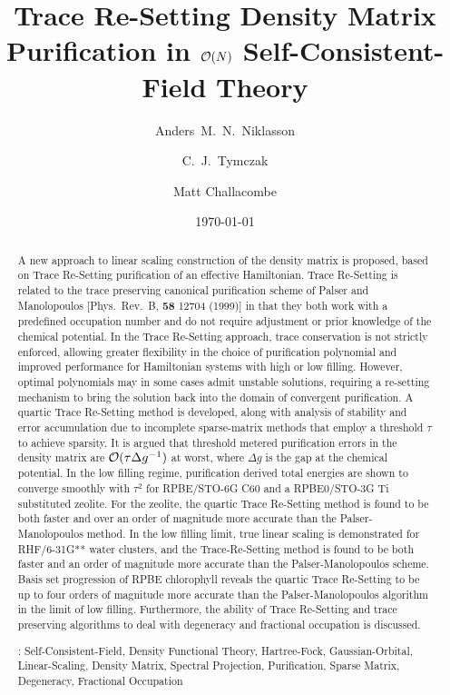 \commentoutA{\documentclass[prb,aps,twocolumn,showpacs,twocolumngrid,superbib]{revtex4}}
\begin{document}
\date{\today}

\title{Trace Re-Setting Density Matrix Purification in ${\cal O}(N)$ Self-Consistent-Field Theory\footnotemark[4] }

\author{Anders~M.~N.~Niklasson\footnotemark[2]}
\author{C.~J.~Tymczak\footnotemark[3]}
\author{Matt Challacombe\footnotemark[6]}

\begin{abstract}
A new approach to linear scaling construction of the density matrix is proposed,
based on Trace Re-Setting purification of an effective Hamiltonian.  Trace Re-Setting 
is related to the trace preserving canonical purification scheme of Palser and Manolopoulos 
[Phys.~Rev.~B, {\bf 58} 12704 (1999)] in that they both work with a predefined 
occupation number and do not require adjustment or prior knowledge of the chemical 
potential.  In the Trace Re-Setting approach, trace conservation is not strictly enforced, allowing 
greater flexibility in the choice of purification polynomial and improved performance for Hamiltonian 
systems with high or low filling.  However, optimal polynomials may in some cases admit unstable solutions, 
requiring a re-setting mechanism to bring the solution back into the domain of convergent 
purification.   A quartic Trace Re-Setting method is developed, along with analysis of 
stability and error accumulation due to incomplete sparse-matrix methods that employ a threshold $\tau$ 
to achieve sparsity.  It is argued that threshold metered purification errors in the 
density matrix are ${\cal O}(\tau \Delta g^{-1})$ at worst, where $\Delta g$ is the gap at 
the chemical potential.  In the low filling regime,  purification derived total energies 
are shown to converge smoothly with $\tau^2$ for RPBE/STO-6G C60 and a RPBE0/STO-3G Ti 
substituted zeolite.  For the zeolite, the quartic Trace Re-Setting method is found to be 
both faster and over an order of magnitude more accurate than the Palser-Manolopoulos method.  In the low 
filling limit, true linear scaling is demonstrated for RHF/6-31G**  water clusters, and the 
Trace-Re-Setting method is found to be both faster and an order of magnitude more accurate 
than the Palser-Manolopoulos scheme.  Basis set progression of RPBE chlorophyll reveals the quartic 
Trace Re-Setting to be up to four orders of magnitude more accurate than the Palser-Manolopoulos algorithm
in the limit of low filling.  Furthermore, the ability of Trace Re-Setting and trace preserving 
algorithms to deal with degeneracy and fractional occupation is discussed.

\smallskip
{}: Self-Consistent-Field, Density Functional Theory, Hartree-Fock, Gaussian-Orbital, 
                         Linear-Scaling, Density Matrix, Spectral Projection, Purification, Sparse Matrix,
                         Degeneracy, Fractional Occupation
\end{abstract}
\end{document}
